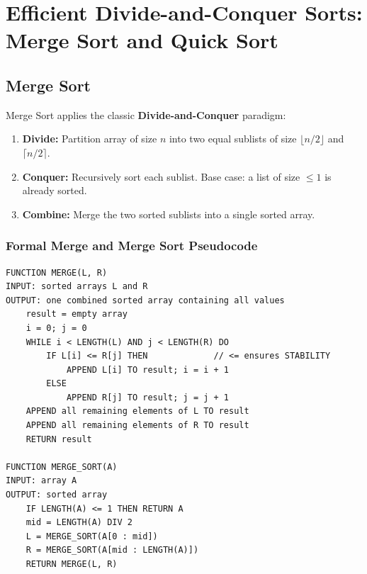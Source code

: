\documentclass[11pt,a4paper]{article}
\begin{document}
\newpage
\section{Efficient Divide-and-Conquer Sorts: Merge Sort and Quick Sort}

\subsection{Merge Sort}
Merge Sort applies the classic \textbf{Divide-and-Conquer} paradigm:
\begin{enumerate}[itemsep=1pt]
    \item \textbf{Divide:} Partition array of size $n$ into two equal sublists of size $\lfloor n/2 \rfloor$ and $\lceil n/2 \rceil$.
    \item \textbf{Conquer:} Recursively sort each sublist. Base case: a list of size $\le 1$ is already sorted.
    \item \textbf{Combine:} Merge the two sorted sublists into a single sorted array.
\end{enumerate}

\begin{center}
\end{center}

\subsubsection{Formal Merge and Merge Sort Pseudocode}
\begin{lstlisting}[style=pseudostyle]
FUNCTION MERGE(L, R)
INPUT: sorted arrays L and R
OUTPUT: one combined sorted array containing all values
    result = empty array
    i = 0; j = 0
    WHILE i < LENGTH(L) AND j < LENGTH(R) DO
        IF L[i] <= R[j] THEN             // <= ensures STABILITY
            APPEND L[i] TO result; i = i + 1
        ELSE
            APPEND R[j] TO result; j = j + 1
    APPEND all remaining elements of L TO result
    APPEND all remaining elements of R TO result
    RETURN result

FUNCTION MERGE_SORT(A)
INPUT: array A
OUTPUT: sorted array
    IF LENGTH(A) <= 1 THEN RETURN A
    mid = LENGTH(A) DIV 2
    L = MERGE_SORT(A[0 : mid])
    R = MERGE_SORT(A[mid : LENGTH(A)])
    RETURN MERGE(L, R)
\end{lstlisting}
\end{document}
